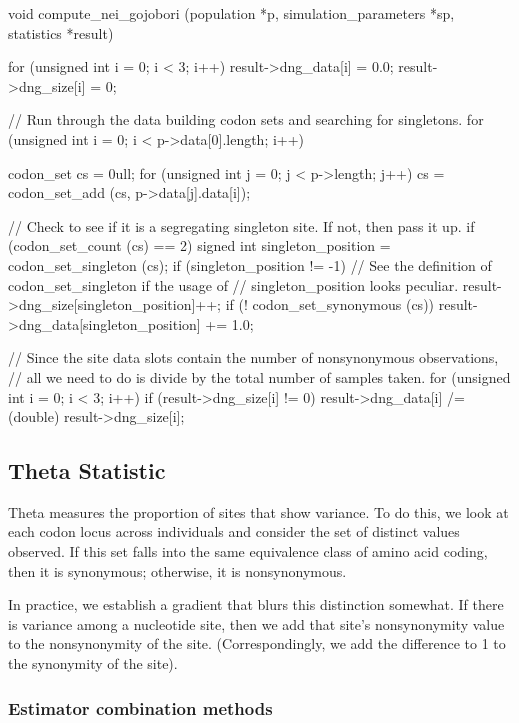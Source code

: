 \documentclass{article}
\begin{document}
\begin{ccode}
void compute_nei_gojobori (population *p, simulation_parameters *sp, statistics *result) {
  for (unsigned int i = 0; i < 3; i++) {
    result->dng_data[i] = 0.0;
    result->dng_size[i] = 0;
  }

  // Run through the data building codon sets and searching for singletons.
  for (unsigned int i = 0; i < p->data[0].length; i++) {
    codon_set cs = 0ull;
    for (unsigned int j = 0; j < p->length; j++)
      cs = codon_set_add (cs, p->data[j].data[i]);

    // Check to see if it is a segregating singleton site. If not, then pass it up.
    if (codon_set_count (cs) == 2) {
      signed int singleton_position = codon_set_singleton (cs);
      if (singleton_position != -1) {
        // See the definition of codon_set_singleton if the usage of
        // singleton_position looks peculiar.
        result->dng_size[singleton_position]++;
        if (! codon_set_synonymous (cs))
         result->dng_data[singleton_position] += 1.0;
      }
    }
  }

  // Since the site data slots contain the number of nonsynonymous observations,
  // all we need to do is divide by the total number of samples taken.
  for (unsigned int i = 0; i < 3; i++)
    if (result->dng_size[i] != 0)
      result->dng_data[i] /= (double) result->dng_size[i];
}
\end{ccode}

    \subsection{Theta Statistic}
      \label{sec:theta-statistic}

      Theta measures the proportion of sites that show variance. To do this, we
      look at each codon locus across individuals and consider the set of
      distinct values observed. If this set falls into the same equivalence
      class of amino acid coding, then it is synonymous; otherwise, it is
      nonsynonymous.

      In practice, we establish a gradient that blurs this distinction somewhat.
      If there is variance among a nucleotide site, then we add that site's
      nonsynonymity value to the nonsynonymity of the site. (Correspondingly, we
	  add the difference to 1 to the synonymity of the site).

      \subsubsection{Estimator combination methods}
	\label{sec:variance-minimization}
\end{document}
